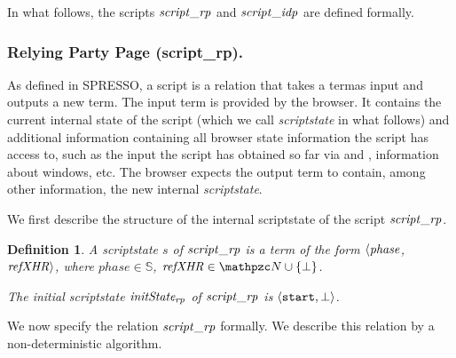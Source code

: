 \documentclass[letterpaper,onecolumn,10pt]{article}
\newtheorem{definition}{Definition}
\begin{document}
In what follows, the scripts $\mathit{script\_rp}$ and $\mathit{script\_idp}$ are
defined formally.

\subsubsection{Relying Party Page (script\_rp).}\label{app:uppresso-script-rp}
As defined in SPRESSO, a script is a relation that takes a termas input and outputs 
a new term. The input term is provided by the browser. It contains the current 
internal state of the script (which we call \emph{scriptstate} in what follows) and
additional information containing all browser state information the
script has access to, such as the input the script has obtained so far
via \xhrs and \pms, information about windows, etc. The browser
expects the output term to contain, among other information, the new internal \emph{scriptstate}.

We first describe the structure of the internal scriptstate
of the script $\mathit{script\_rp}$.

\begin{definition} \label{def:scriptstaterp} 
A \emph{scriptstate $s$ of $\mathit{script\_rp}$} is a term of the form $\langle 
\mathit{phase}$, 
$\mathit{refXHR}\rangle$, 
where $phase \in \mathbb{S}$, 
$\mi{refXHR}\in \nonces \cup \{\bot\}$. 

The \emph{initial scriptstate $\mathit{initState_{rp}}$} of $\mathit{script\_rp}$ is 
$\langle\mathtt{start},
\bot\rangle$.
\end{definition}

We now specify the relation $\mathit{script\_rp}$ formally. We describe this relation
by a non-deterministic algorithm.
\end{document}
